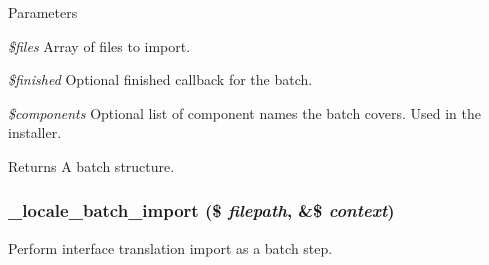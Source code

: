\begin{DoxyParams}{Parameters}
\item[{\em \$files}]Array of files to import. \item[{\em \$finished}]Optional finished callback for the batch. \item[{\em \$components}]Optional list of component names the batch covers. Used in the installer.\end{DoxyParams}
\begin{DoxyReturn}{Returns}
A batch structure. 
\end{DoxyReturn}
\hypertarget{group__locale_ga97c8b79262e3aa8af4e5ea3b7908b99b}{
\subsubsection[{\_\-locale\_\-batch\_\-import}]{\setlength{\rightskip}{0pt plus 5cm}\_\-locale\_\-batch\_\-import (\$ {\em filepath}, \/  \&\$ {\em context})}}
\label{group__locale_ga97c8b79262e3aa8af4e5ea3b7908b99b}
Perform interface translation import as a batch step.


